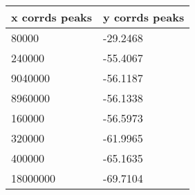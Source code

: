 \begin{tabular}{ll}
x corrds peaks & y corrds peaks \\ 
\hline 
80000 & -29.2468 \\ 
240000 & -55.4067 \\ 
9040000 & -56.1187 \\ 
8960000 & -56.1338 \\ 
160000 & -56.5973 \\ 
320000 & -61.9965 \\ 
400000 & -65.1635 \\ 
18000000 & -69.7104 \\ 
\hline 
\end{tabular}